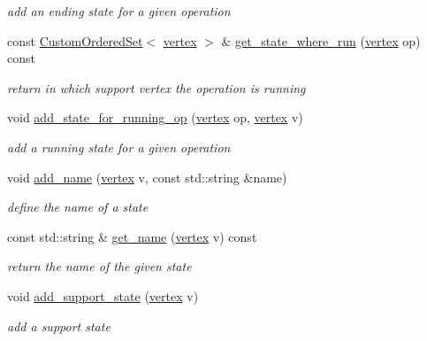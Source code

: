 \begin{DoxyCompactItemize}
\begin{DoxyCompactList}\small\item\em add an ending state for a given operation \end{DoxyCompactList}\item 
const \hyperlink{classCustomOrderedSet}{Custom\+Ordered\+Set}$<$ \hyperlink{graph_8hpp_abefdcf0544e601805af44eca032cca14}{vertex} $>$ \& \hyperlink{classliveness_adf512e3be101982e75ace23f6c1a096d}{get\+\_\+state\+\_\+where\+\_\+run} (\hyperlink{graph_8hpp_abefdcf0544e601805af44eca032cca14}{vertex} op) const
\begin{DoxyCompactList}\small\item\em return in which support vertex the operation is running \end{DoxyCompactList}\item 
void \hyperlink{classliveness_a9c715edd104bd38483f3baeb47cdebce}{add\+\_\+state\+\_\+for\+\_\+running\+\_\+op} (\hyperlink{graph_8hpp_abefdcf0544e601805af44eca032cca14}{vertex} op, \hyperlink{graph_8hpp_abefdcf0544e601805af44eca032cca14}{vertex} v)
\begin{DoxyCompactList}\small\item\em add a running state for a given operation \end{DoxyCompactList}\item 
void \hyperlink{classliveness_a67923b3a3e7ebdf4c92b87977e7be7cd}{add\+\_\+name} (\hyperlink{graph_8hpp_abefdcf0544e601805af44eca032cca14}{vertex} v, const std\+::string \&name)
\begin{DoxyCompactList}\small\item\em define the name of a state \end{DoxyCompactList}\item 
const std\+::string \& \hyperlink{classliveness_a82ed916485e74cfa88f9ef53da286bc2}{get\+\_\+name} (\hyperlink{graph_8hpp_abefdcf0544e601805af44eca032cca14}{vertex} v) const
\begin{DoxyCompactList}\small\item\em return the name of the given state \end{DoxyCompactList}\item 
void \hyperlink{classliveness_a90b74351a91f309c677f5de8692c02ef}{add\+\_\+support\+\_\+state} (\hyperlink{graph_8hpp_abefdcf0544e601805af44eca032cca14}{vertex} v)
\begin{DoxyCompactList}\small\item\em add a support state \end{DoxyCompactList}\item 

\end{DoxyCompactItemize}
